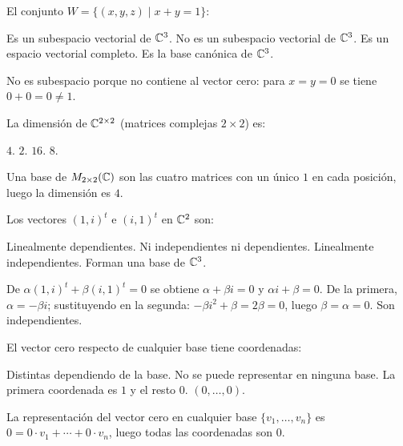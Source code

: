 \begin{questions}


  \question El conjunto $W = \{(x,y,z) \mid x + y = 1\}$:

  \begin{choices}
    \choice Es un subespacio vectorial de $\mathbb{C}^3$.
    \CorrectChoice No es un subespacio vectorial de $\mathbb{C}^3$.
    \choice Es un espacio vectorial completo.
    \choice Es la base canónica de $\mathbb{C}^3$.
  \end{choices}
  \begin{solution}
    No es subespacio porque no contiene al vector cero: para $x=y=0$ se tiene $0+0=0\neq 1$.
  \end{solution}

  \question La dimensión de $\mathbb{C}^{2\times 2}$ (matrices complejas $2\times 2$) es:

  \begin{choices}
    \CorrectChoice $4$.
    \choice $2$.
    \choice $16$.
    \choice $8$.
  \end{choices}
  \begin{solution}
    Una base de $M_{2\times 2}(\mathbb{C})$ son las cuatro matrices con un único $1$ en cada posición, luego la dimensión es $4$.
  \end{solution}

  \question Los vectores $(1,i)^t$ e $(i,1)^t$ en $\mathbb{C}^2$ son:

  \begin{choices}
    \choice Linealmente dependientes.
    \choice Ni independientes ni dependientes.
    \CorrectChoice Linealmente independientes.
    \choice Forman una base de $\mathbb{C}^3$.
  \end{choices}
  \begin{solution}
    De $\alpha(1,i)^t+\beta(i,1)^t=0$ se obtiene $\alpha+\beta i=0$ y $\alpha i+\beta=0$. De la primera, $\alpha=-\beta i$; sustituyendo en la segunda: $-\beta i^2+\beta=2\beta=0$, luego $\beta=\alpha=0$. Son independientes.
  \end{solution}

  \question El vector cero respecto de cualquier base tiene coordenadas:

  \begin{choices}
    \choice Distintas dependiendo de la base.
    \choice No se puede representar en ninguna base.
    \choice La primera coordenada es $1$ y el resto $0$.
    \CorrectChoice $(0,\ldots,0)$.
  \end{choices}
  \begin{solution}
    La representación del vector cero en cualquier base $\{v_1,\ldots,v_n\}$ es $0 = 0\cdot v_1+\cdots+0\cdot v_n$, luego todas las coordenadas son $0$.
  \end{solution}


\end{questions}
